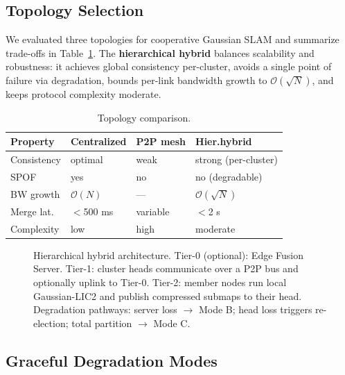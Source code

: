 \label{sec:network}

\subsection{Topology Selection}

We evaluated three topologies for cooperative Gaussian SLAM and summarize
trade-offs in Table~\ref{tab:topology}. The \textbf{hierarchical hybrid}
balances scalability and robustness: it achieves global consistency
per-cluster, avoids a single point of failure via degradation, bounds
per-link bandwidth growth to $\mathcal{O}(\sqrt{N})$, and keeps protocol
complexity moderate.

\begin{table}[t]
  \centering
  \caption{Topology comparison.}
  \label{tab:topology}
  \footnotesize
  \setlength{\tabcolsep}{4pt}
  \begin{tabular}{@{}p{1.4cm}p{2.2cm}p{2.2cm}p{2.2cm}@{}}
    \toprule
    Property & Centralized & P2P mesh & Hier.\@ hybrid \\
    \midrule
    Consistency  & optimal & weak  & strong (per-cluster) \\
    SPOF         & yes     & no    & no (degradable) \\
    BW growth    & $\mathcal{O}(N)$ & --- & $\mathcal{O}(\sqrt{N})$ \\
    Merge lat.\@ & $<$500 ms & variable & $<$2 s \\
    Complexity   & low     & high  & moderate \\
    \bottomrule
  \end{tabular}
\end{table}

\begin{figure}[t]
  \centering
  \resizebox{\columnwidth}{!}{}
  \caption{Hierarchical hybrid architecture. Tier-0 (optional): Edge Fusion
  Server. Tier-1: cluster heads communicate over a P2P bus and optionally
  uplink to Tier-0. Tier-2: member nodes run local Gaussian-LIC2 and publish
  compressed submaps to their head. Degradation pathways: server loss
  $\to$ Mode B; head loss triggers re-election; total partition $\to$ Mode C.}
  \label{fig:topology}
\end{figure}

\subsection{Graceful Degradation Modes}

